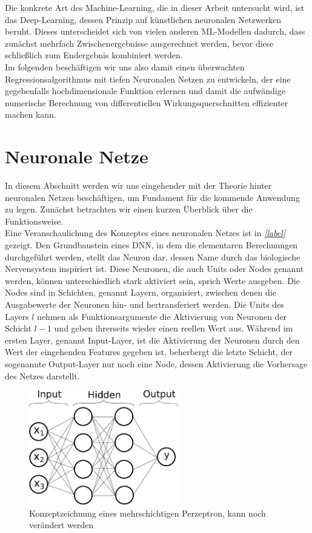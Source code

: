 \newline
Die konkrete Art des Machine-Learning, die in dieser Arbeit untersucht wird, ist das Deep-Learning, dessen Prinzip auf künstlichen neuronalen Netzwerken beruht. Dieses unterscheidet sich von vielen anderen ML-Modellen dadurch, dass zunächst mehrfach Zwischenergebnisse ausgerechnet werden, bevor diese schließlich zum Endergebnis kombiniert werden. \\
Im folgenden beschäftigen wir uns also damit einen überwachten Regressionsalgorithmus mit tiefen Neuronalen Netzen zu entwickeln, der eine gegebenfalls hochdimensionale Funktion erlernen und damit die aufwändige numerische Berechnung von differentiellen Wirkungsquerschnitten effizienter machen kann.

\section{Neuronale Netze}
In diesem Abschnitt werden wir uns eingehender mit der Theorie hinter neuronalen Netzen beschäftigen, um Fundament für die kommende Anwendung zu legen. Zunächst betrachten wir einen kurzen Überblick über die Funktionsweise. \\
Eine Veranschaulichung des Konzeptes eines neuronalen Netzes ist in \textit{\autoref{label}} gezeigt.
Den Grundbaustein eines DNN, in dem die elementaren Berechnungen durchgeführt werden, stellt das Neuron dar, dessen Name durch das biologische Nervensystem inspiriert ist.
 Diese Neuronen, die auch Units oder Nodes genannt werden, können unterschiedlich stark aktiviert sein, sprich Werte ausgeben. Die Nodes sind in Schichten, genannt Layern, organisiert, zwischen denen die Ausgabewerte der Neuronen hin- und hertransferiert werden. Die Units des Layers $l$ nehmen als Funktionsargumente die Aktivierung von Neuronen der Schicht $l-1$ und geben ihrerseits wieder einen reellen Wert aus. Während im ersten Layer, genannt Input-Layer, ist die Aktivierung der Neuronen durch den Wert der eingehenden Features gegeben ist, beherbergt die letzte Schicht, der sogenannte Output-Layer nur noch eine Node, dessen Aktivierung die Vorhersage des Netzes darstellt. \\
 \begin{figure}
 	\includegraphics[width=65mm]{graphics/NeuralNetwork}
 	\caption{Konzeptzeichnung eines mehrschichtigen Perzeptron, kann noch verändert werden}
 \end{figure}
